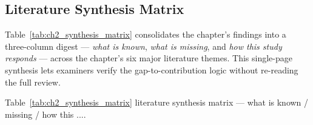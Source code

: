 \subsection*{Literature Synthesis Matrix}
\label{sec:ch2_synthesis_matrix}

\noindent Table~\ref{tab:ch2_synthesis_matrix} consolidates the chapter's findings into a three-column digest --- \emph{what is known}, \emph{what is missing}, and \emph{how this study responds} --- across the chapter's six major literature themes. This single-page synthesis lets examiners verify the gap-to-contribution logic without re-reading the full review.

\noindent Table~\ref{tab:ch2_synthesis_matrix} literature synthesis matrix --- what is known / missing / how this ....

{\tablestripes\tablefontsize

}
